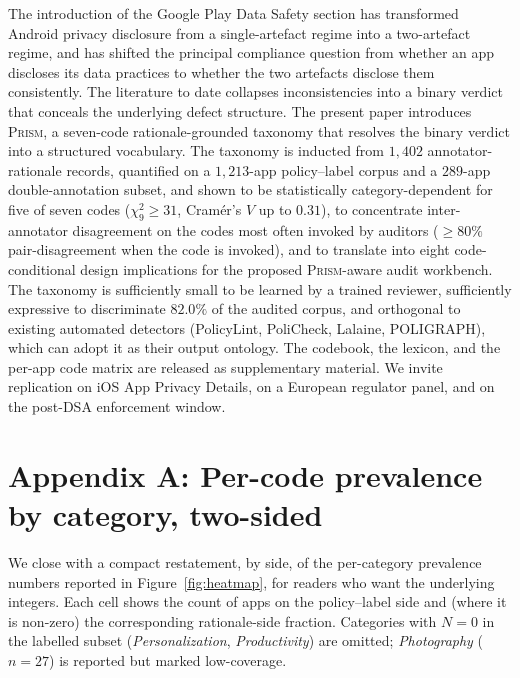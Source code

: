 \documentclass[11pt,a4paper]{article}
\newcommand{\prism}{\textsc{Prism}}
\begin{document}
The introduction of the Google Play Data Safety section has
transformed Android privacy disclosure from a single-artefact regime
into a two-artefact regime, and has shifted the principal compliance
question from whether an app discloses its data practices to whether
the two artefacts disclose them consistently. The literature to date
collapses inconsistencies into a binary verdict that conceals the
underlying defect structure. The present paper introduces \prism{},
a seven-code rationale-grounded taxonomy that resolves the binary
verdict into a structured vocabulary. The taxonomy is inducted from
$1{,}402$ annotator-rationale records, quantified on a $1{,}213$-app
policy--label corpus and a $289$-app double-annotation subset, and
shown to be statistically category-dependent for five of seven codes
($\chi^2_9 \geq 31$, Cram\'er's $V$ up to $0.31$), to concentrate
inter-annotator disagreement on the codes most often invoked by
auditors ($\geq 80\%$ pair-disagreement when the code is invoked), and
to translate into
eight code-conditional design implications for the proposed
\prism{}-aware audit workbench. The taxonomy is sufficiently small
to be learned by a trained reviewer, sufficiently expressive to
discriminate $82.0\%$ of the audited corpus, and orthogonal to
existing automated detectors (PolicyLint, PoliCheck, Lalaine,
POLIGRAPH), which can adopt it as their output ontology. The
codebook, the lexicon, and the per-app code matrix are released as
supplementary material. We invite replication on iOS App Privacy
Details, on a European regulator panel, and on the post-DSA
enforcement window.

\section*{Appendix A: Per-code prevalence by category, two-sided}
We close with a compact restatement, by side, of the per-category
prevalence numbers reported in Figure~\ref{fig:heatmap}, for readers
who want the underlying integers. Each cell shows the count of apps
on the policy--label side and (where it is non-zero) the corresponding
rationale-side fraction. Categories with $N=0$ in the labelled subset
(\emph{Personalization}, \emph{Productivity}) are omitted; \emph{Photography}
($n=27$) is reported but marked low-coverage.
\end{document}
